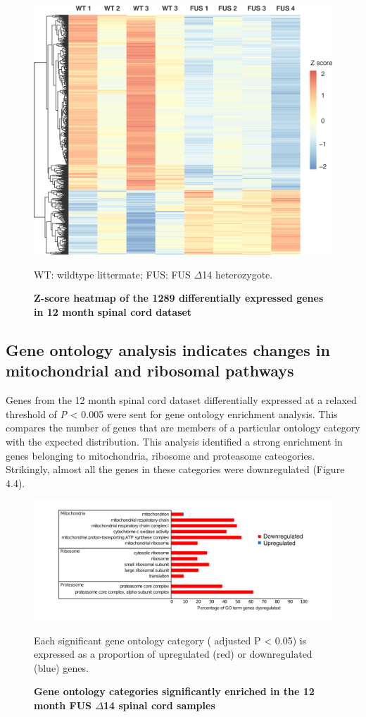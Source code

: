 \begin{figure}[h!]
	\begin{center}
		\includegraphics[width=\textwidth]{Figures/04_fus_mice/anny_normalised_heatmap.png}
	\end{center}
	\caption{\textbf{Z-score heatmap of the 1289 differentially expressed genes in 12 month spinal cord dataset}}
	WT: wildtype littermate; FUS: FUS $\Delta$14 heterozygote. 
\end{figure}


\subsection{Gene ontology analysis indicates changes in mitochondrial and ribosomal pathways}
Genes from the 12 month spinal cord dataset differentially expressed at a relaxed threshold of \textit{P} < 0.005 were sent for gene ontology enrichment analysis. This compares the number of genes that are members of a particular ontology category with the expected distribution. This analysis identified a strong enrichment in genes belonging to mitochondria, ribosome and proteasome cateogories. Strikingly, almost all the genes in these categories were downregulated (Figure 4.4).
\begin{figure}[h!]
	\begin{center}
		\includegraphics[width=12cm]{Figures/04_fus_mice/anny_GO_terms.png}
	\end{center}
	\caption{\textbf{Gene ontology categories significantly enriched in the 12 month FUS $\Delta$14 spinal cord samples}}
		Each significant gene ontology category ( adjusted P < 0.05) is expressed as a proportion of upregulated (red) or downregulated (blue) genes.
		\label{fig:delta14_go}
\end{figure}


